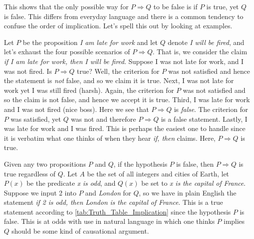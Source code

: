         \par\vspace{2.5ex}
        This shows that the only possible way for $P\Rightarrow{Q}$ to be false
        is if $P$ is true, yet $Q$ is false. This differs from everyday language
        and there is a common tendency to confuse the order of implication.
        Let's spell this out by looking at examples.
        \begin{example}
            \label{ex:Mathematical_Implication}%
            Let $P$ be the proposition \textit{I am late for work} and let $Q$
            denote \textit{I will be fired}, and let's exhaust the four
            possible scenarios of $P\Rightarrow{Q}$. That is, we consider the
            claim \textit{if I am late for work, then I will be fired}. Suppose
            I was not late for work, and I was not fired. Is $P\Rightarrow{Q}$
            true? Well, the criterion for $P$ was not satisfied and hence the
            statement is \textit{not} false, and so we claim it is true. Next, I
            was not late for work yet I was still fired (harsh). Again, the
            criterion for $P$ was not satisfied and so the claim is not false,
            and hence we accept it is true. Third, I was late for work and I was
            not fired (nice boss). Here we see that $P\Rightarrow{Q}$ is
            \textit{false}. The criterion for $P$ was satisfied, yet $Q$ was not
            and therefore $P\Rightarrow{Q}$ is a false statement. Lastly, I was
            late for work and I was fired. This is perhaps the easiest one to
            handle since it is verbatim what one thinks of when they hear
            \textit{if, then} claims. Here, $P\Rightarrow{Q}$ is true.
        \end{example}
        \begin{example}
            \label{ex:False_Antecedent}%
            Given any two propositions $P$ and $Q$, if the hypothesis $P$ is
            false, then $P\Rightarrow{Q}$ is true regardless of $Q$. Let $A$ be
            the set of all integers and cities of Earth, let $P(x)$ be the
            predicate \textit{x is odd}, and $Q(x)$ be set to
            \textit{x is the capital of France}. Suppose we input 2 into $P$ and
            \textit{London} for $Q$, so we have in plain English the statement
            \textit{if 2 is odd, then London is the capital of France}. This is
            a true statement according to \ref{tab:Truth_Table_Implication}
            since the hypothesis $P$ is false. This is at odds with use in
            natural language in which one thinks $P$ implies $Q$ should be some
            kind of causational argument.
        \end{example}
